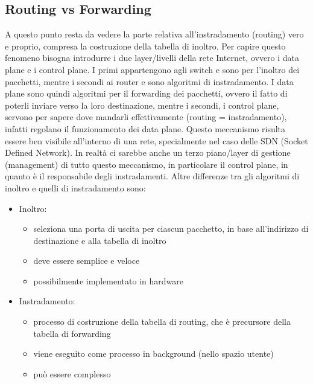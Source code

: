 \subsection{Routing vs Forwarding}
A questo punto resta da vedere la parte relativa all’instradamento (routing) vero e proprio, compresa la costruzione della tabella di inoltro. Per capire questo fenomeno bisogna introdurre i due layer/livelli della rete Internet, ovvero i data plane e i control plane. I primi appartengono agli switch e sono per l’inoltro dei pacchetti, mentre i secondi ai router e sono algoritmi di instradamento. I data plane sono quindi algoritmi per il forwarding dei pacchetti, ovvero il fatto di poterli inviare verso la loro destinazione, mentre i secondi, i control plane, servono per sapere dove mandarli effettivamente (routing = instradamento), infatti regolano il funzionamento dei data plane. Questo meccanismo risulta essere ben visibile all’interno di una rete, specialmente nel caso delle SDN (Socket Defined Network). In realtà ci sarebbe anche un terzo piano/layer di gestione (management) di tutto questo meccanismo, in particolare il control plane, in quanto è il responsabile degli instradamenti. Altre differenze tra gli algoritmi di inoltro e quelli di instradamento sono:
\begin{itemize}
  \item Inoltro:
        \begin{itemize}
          \item seleziona una porta di uscita per ciascun pacchetto, in base all’indirizzo di destinazione e alla tabella di inoltro
          \item deve essere semplice e veloce
          \item possibilmente implementato in hardware
        \end{itemize} 
  \item Instradamento:
        \begin{itemize}
          \item processo di costruzione della tabella di routing, che è precursore della tabella di forwarding
          \item viene eseguito come processo in background (nello spazio utente)
          \item può essere complesso
        \end{itemize}
\end{itemize}
